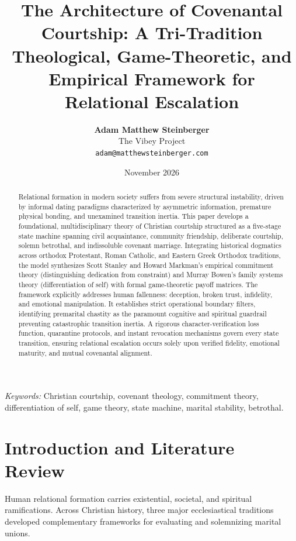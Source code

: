 \documentclass[11pt,twocolumn]{article}
\title{\textbf{The Architecture of Covenantal Courtship: A Tri-Tradition Theological, Game-Theoretic, and Empirical Framework for Relational Escalation}}
\author{\textbf{Adam Matthew Steinberger}\\
The Vibey Project\\
\texttt{adam@matthewsteinberger.com}}
\date{November 2026}
\begin{document}
\maketitle

\begin{abstract}
Relational formation in modern society suffers from severe structural instability, driven by informal dating paradigms characterized by asymmetric information, premature physical bonding, and unexamined transition inertia. This paper develops a foundational, multidisciplinary theory of Christian courtship structured as a five-stage state machine spanning civil acquaintance, community friendship, deliberate courtship, solemn betrothal, and indissoluble covenant marriage. Integrating historical dogmatics across orthodox Protestant, Roman Catholic, and Eastern Greek Orthodox traditions, the model synthesizes Scott Stanley and Howard Markman's empirical commitment theory (distinguishing dedication from constraint) and Murray Bowen's family systems theory (differentiation of self) with formal game-theoretic payoff matrices. The framework explicitly addresses human fallenness: deception, broken trust, infidelity, and emotional manipulation. It establishes strict operational boundary filters, identifying premarital chastity as the paramount cognitive and spiritual guardrail preventing catastrophic transition inertia. A rigorous character-verification loss function, quarantine protocols, and instant revocation mechanisms govern every state transition, ensuring relational escalation occurs solely upon verified fidelity, emotional maturity, and mutual covenantal alignment.
\end{abstract}

\noindent\textit{Keywords:} Christian courtship, covenant theology, commitment theory, differentiation of self, game theory, state machine, marital stability, betrothal.

\section{Introduction and Literature Review}
Human relational formation carries existential, societal, and spiritual ramifications. Across Christian history, three major ecclesiastical traditions developed complementary frameworks for evaluating and solemnizing marital unions.
\end{document}
